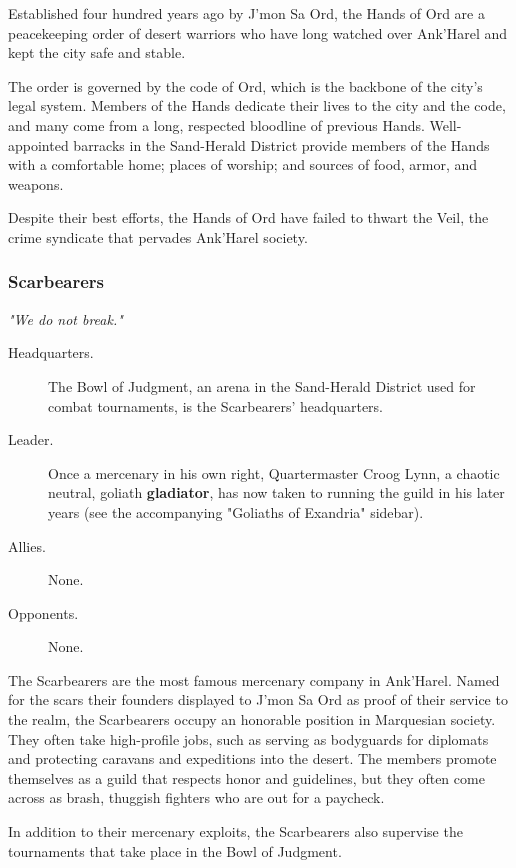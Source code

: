 \documentclass[a4paper, 11pt, bg=full, twocolumn, nooutline]{dndbook}
\begin{document}
Established four hundred years ago by J'mon Sa Ord, the Hands of Ord are a peacekeeping order of desert warriors who have long watched over Ank'Harel and kept the city safe and stable.

The order is governed by the code of Ord, which is the backbone of the city's legal system. Members of the Hands dedicate their lives to the city and the code, and many come from a long, respected bloodline of previous Hands. Well-appointed barracks in the Sand-Herald District provide members of the Hands with a comfortable home; places of worship; and sources of food, armor, and weapons.

Despite their best efforts, the Hands of Ord have failed to thwart the Veil, the crime syndicate that pervades Ank'Harel society.

\subsubsection{Scarbearers}

\textit{"We do not break."}

\begin{description}
\item[Headquarters.] The Bowl of Judgment, an arena in the Sand-Herald District used for combat tournaments, is the Scarbearers' headquarters.
\item[Leader.] Once a mercenary in his own right, Quartermaster Croog Lynn, a chaotic neutral, goliath \textbf{gladiator}, has now taken to running the guild in his later years (see the accompanying "Goliaths of Exandria" sidebar).
\item[Allies.] None.
\item[Opponents.] None.
\end{description}

The Scarbearers are the most famous mercenary company in Ank'Harel. Named for the scars their founders displayed to J'mon Sa Ord as proof of their service to the realm, the Scarbearers occupy an honorable position in Marquesian society. They often take high-profile jobs, such as serving as bodyguards for diplomats and protecting caravans and expeditions into the desert. The members promote themselves as a guild that respects honor and guidelines, but they often come across as brash, thuggish fighters who are out for a paycheck.

In addition to their mercenary exploits, the Scarbearers also supervise the tournaments that take place in the Bowl of Judgment.
\end{document}
